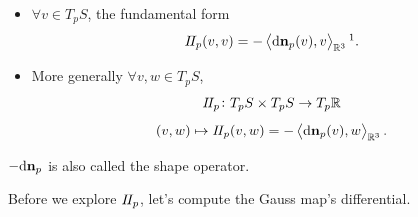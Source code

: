 \begin{definition}
    \hfill
    \begin{itemize}
        \item \(\forall v\in T_p S\), the  fundamental
        form 
        \[\II_p(v,v)=
        -\left\langle \dd\vb{n}_p(v),
        v\right\rangle_{\mathbb{R}^3}\footnotemark.\]
        \item More generally \(\forall v,w\in T_p S\), 
        \[
            I\!I_p\colon T_p S\times T_p S\to T_p \mathbb{R}
        \]
         \[   (v,w)\mapsto I\!I_p(v,w)=-\left\langle
                \dd\vb{n}_p(v),w\right\rangle_{\mathbb{R}^3}.
        \]

    \end{itemize}
    \(-\dd \vb{n}_p\) is also called the shape operator.
\end{definition}
Before we explore \(I\!I_p\), let's compute the Gauss map's
differential.

